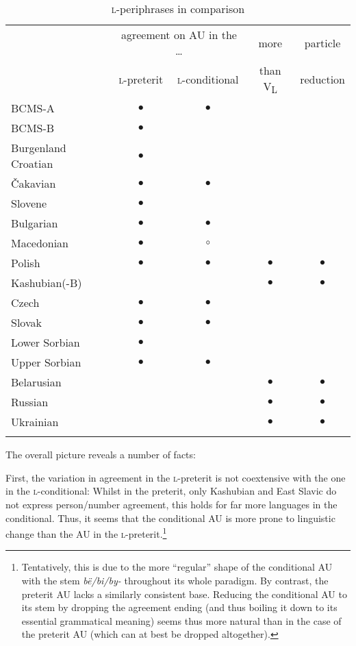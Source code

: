 \documentclass[output=paper]{langscibook}
\begin{document}
\begin{table}
\begin{tabularx}{12cm}{Xcccc}
\lsptoprule
& \multicolumn{2}{c}{agreement on AU in the \dots} & more & particle \\
& \textsc{l-}preterit & \textsc{l-}conditional & than V\textsubscript{L} & reduction \\
\midrule
BCMS-A & $\bullet$ & $\bullet$ & & \\ 
BCMS-B & $\bullet$ & & & \\ 
Burgenland Croatian & $\bullet$ & & & \\ 
Čakavian & $\bullet$ & $\bullet$ & & \\ 
Slovene & $\bullet$ & & & \\ 
Bulgarian & $\bullet$ & $\bullet$ & & \\ 
Macedonian & $\bullet$ & $\circ$ & & \\\addlinespace
Polish & $\bullet$ & $\bullet$ & $\bullet$ & $\bullet$ \\ 
Kashubian(-B) & & & $\bullet$ & $\bullet$ \\ 
Czech & $\bullet$ & $\bullet$ & & \\ 
Slovak & $\bullet$ & $\bullet$ & & \\ 
Lower Sorbian & $\bullet$ & & & \\ 
Upper Sorbian & $\bullet$ & $\bullet$ & & \\\addlinespace
Belarusian & & & $\bullet$ & $\bullet$\\ 
Russian & & & $\bullet$ & $\bullet$\\ 
Ukrainian & & & $\bullet$ & $\bullet$\\ 
\lspbottomrule
\end{tabularx}
    \caption{\textsc{l-}periphrases in comparison}
    \label{pitsch:tab:overview}
\end{table}

The overall picture reveals a number of facts:

First, the variation in agreement in the \textsc{l-}preterit is not coextensive with the one in the \textsc{l-}conditional: Whilst in the preterit, only Kashubian and East Slavic do not express person/\hspace{0mm}number agreement, this holds for far more languages in the conditional. Thus, it seems that the conditional AU is more prone to linguistic change than the AU in the \textsc{l-}preterit.\footnote{Tentatively, this is due to the more ``regular'' shape of the conditional AU with the stem \textit{bë/bi/by-} throughout its whole paradigm. By contrast, the preterit AU lacks a similarly consistent base. Reducing the conditional AU to its stem by dropping the agreement ending (and thus boiling it down to its essential grammatical meaning) seems thus more natural than in the case of the preterit AU (which can at best be dropped altogether).}
\end{document}
